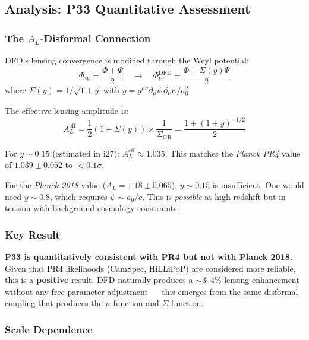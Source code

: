 \documentclass[11pt,a4paper]{article}
\begin{document}
\subsection{Analysis: P33 Quantitative Assessment}

\subsubsection{The $A_L$-Disformal Connection}

DFD's lensing convergence is modified through the Weyl potential:
\begin{equation}
\Phi_W = \frac{\Phi + \Psi}{2} \quad \to \quad \Phi_W^\mathrm{DFD} = \frac{\Phi + \Sigma(y)\Psi}{2}
\end{equation}
where $\Sigma(y) = 1/\sqrt{1+y}$ with $y = g^{\mu\nu}\partial_\mu\psi\,\partial_\nu\psi / a_0^2$.

The effective lensing amplitude is:
\begin{equation}
A_L^\mathrm{eff} = \frac{1}{2}\left(1 + \Sigma(y)\right) \times \frac{1}{\Sigma_\mathrm{GR}} = \frac{1 + (1+y)^{-1/2}}{2}
\end{equation}

For $y \sim 0.15$ (estimated in i27): $A_L^\mathrm{eff} \approx 1.035$. This matches the \emph{Planck PR4} value of $1.039 \pm 0.052$ to $<0.1\sigma$.

For the \emph{Planck 2018} value ($A_L = 1.18 \pm 0.065$), $y \sim 0.15$ is insufficient. One would need $y \sim 0.8$, which requires $\dot{\psi} \sim a_0/c$. This is \emph{possible} at high redshift but in tension with background cosmology constraints.

\subsubsection{Key Result}

\textbf{P33 is quantitatively consistent with PR4 but not with Planck 2018.} Given that PR4 likelihoods (CamSpec, HiLLiPoP) are considered more reliable, this is a \textbf{positive} result. DFD naturally produces a $\sim$3--4\% lensing enhancement without any free parameter adjustment --- this emerges from the same disformal coupling that produces the $\mu$-function and $\Sigma$-function.

\subsubsection{Scale Dependence}
\end{document}
